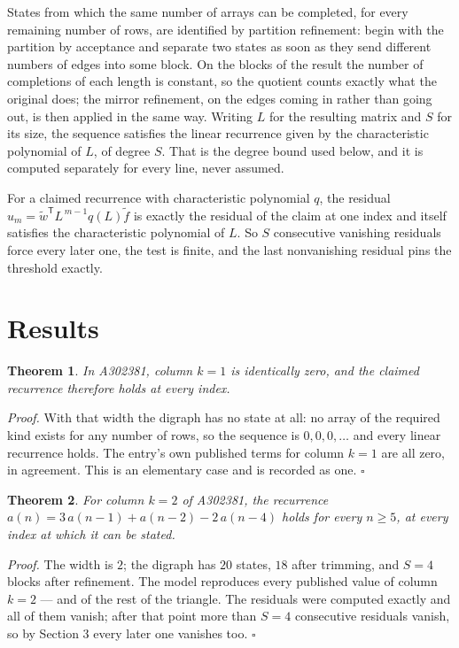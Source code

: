 \documentclass[11pt]{article}
\newtheorem{theorem}{Theorem}
\theoremstyle{definition}
\begin{document}
States from which the same number of arrays can be completed, for every remaining number of rows, are identified by partition refinement: begin with the partition by acceptance and separate two states as soon as they send different numbers of edges into some block. On the blocks of the result the number of completions of each length is constant, so the quotient counts exactly what the original does; the mirror refinement, on the edges coming in rather than going out, is then applied in the same way. Writing $L$ for the resulting matrix and $S$ for its size, the sequence satisfies the linear recurrence given by the characteristic polynomial of $L$, of degree $S$. That is the degree bound used below, and it is computed separately for every line, never assumed.

For a claimed recurrence with characteristic polynomial $q$, the residual $u_m = \tilde w^{\mathsf T}L^{\,m-1}q(L)\tilde f$ is exactly the residual of the claim at one index and itself satisfies the characteristic polynomial of $L$. So $S$ consecutive vanishing residuals force every later one, the test is finite, and the last nonvanishing residual pins the threshold exactly.

\section{Results}

\begin{theorem} In A302381, column $k = 1$ is identically zero, and the claimed recurrence therefore holds at every index.\end{theorem}

{\itshape Proof.} With that width the digraph has no state at all: no array of the required kind exists for any number of rows, so the sequence is $0,0,0,\dots$ and every linear recurrence holds. The entry's own published terms for column $k = 1$ are all zero, in agreement. This is an elementary case and is recorded as one. $\square$

\begin{theorem} For column $k = 2$ of A302381, the recurrence $a(n) = 3\,a(n-1) + a(n-2) - 2\,a(n-4)$ holds for every $n \ge 5$, at every index at which it can be stated.\end{theorem}

{\itshape Proof.} The width is $2$; the digraph has $20$ states, $18$ after trimming, and $S = 4$ blocks after refinement. The model reproduces every published value of column $k = 2$ --- and of the rest of the triangle. The residuals were computed exactly and all of them vanish; after that point more than $S = 4$ consecutive residuals vanish, so by Section 3 every later one vanishes too. $\square$
\end{document}
